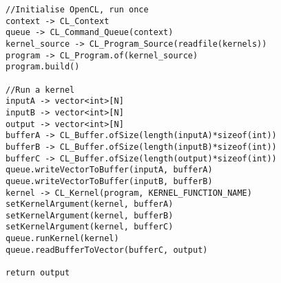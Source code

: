 \begin{minipage}{\linewidth}
\begin{lstlisting}[caption=Psuedocode of CL Initialisation and Kernel Execution, label=code:cl_init]
//Initialise OpenCL, run once
context -> CL_Context
queue -> CL_Command_Queue(context)
kernel_source -> CL_Program_Source(readfile(kernels))
program -> CL_Program.of(kernel_source)
program.build()

//Run a kernel
inputA -> vector<int>[N]
inputB -> vector<int>[N]
output -> vector<int>[N]
bufferA -> CL_Buffer.ofSize(length(inputA)*sizeof(int))
bufferB -> CL_Buffer.ofSize(length(inputB)*sizeof(int))
bufferC -> CL_Buffer.ofSize(length(output)*sizeof(int))
queue.writeVectorToBuffer(inputA, bufferA)
queue.writeVectorToBuffer(inputB, bufferB)
kernel -> CL_Kernel(program, KERNEL_FUNCTION_NAME)
setKernelArgument(kernel, bufferA)
setKernelArgument(kernel, bufferB)
setKernelArgument(kernel, bufferC)
queue.runKernel(kernel)
queue.readBufferToVector(bufferC, output)

return output

\end{lstlisting}
\end{minipage}
